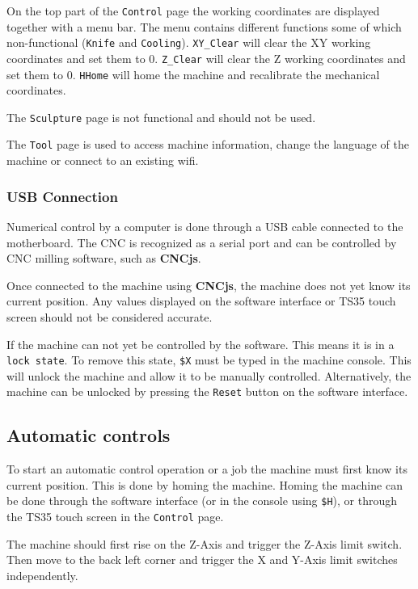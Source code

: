 \documentclass[11pt, openright]{book}
\begin{document}
        On the top part of the \texttt{Control} page the working coordinates are displayed together with a menu bar. The menu contains different functions some of which non-functional (\texttt{Knife} and \texttt{Cooling}). \texttt{XY\_Clear} will clear the XY working coordinates and set them to 0. \texttt{Z\_Clear} will clear the Z working coordinates and set them to 0. \texttt{HHome} will home the machine and recalibrate the mechanical coordinates. 

        The \texttt{Sculpture} page is not functional and should not be used.  


        The \texttt{Tool} page is used to access machine information, change the language of the machine or connect to an existing wifi. 

        \subsubsection{USB Connection}

        Numerical control by a computer is done through a USB cable connected to the motherboard. The CNC is recognized as a serial port and can be controlled by CNC milling software, such as \textbf{CNCjs}.
        
        Once connected to the machine using \textbf{CNCjs}, the machine does not yet know its current position. Any values displayed on the software interface or TS35 touch screen should not be considered accurate. 

        If the machine can not yet be controlled by the software. This means it is in a \texttt{lock state}. To remove this state, \texttt{\$X} must be typed in the machine console. This will unlock the machine and allow it to be manually controlled. Alternatively, the machine can be unlocked by pressing the \texttt{Reset} button on the software interface.
        
        \subsection{Automatic controls}

        To start an automatic control operation or a job the machine must first know its current position. This is done by homing the machine. Homing the machine can be done through the software interface (or in the console using \texttt{\$H}),  or through the TS35 touch screen in the \texttt{Control} page. 

        The machine should first rise on the Z-Axis and trigger the Z-Axis limit switch. Then move to the back left corner and trigger the X and Y-Axis limit switches independently.
\end{document}
